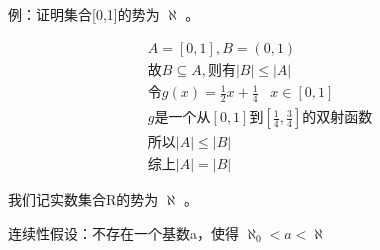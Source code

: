 \documentclass[12pt,a4paper,oneside]{ctexart}
\begin{document}
例：证明集合{[}0,1{]}的势为 \(\aleph\) 。

\[\begin{gathered}
A=[0,1],B=(0,1)\\
\text{故}B\subseteq A,\text{则有}|B|\leqslant|A|\\
\text{令}g(x)=\frac{1}{2}x+\frac{1}{4}\;\;\;x\in [0,1]\\
g\text{是一个从}[0,1]\text{到}[\frac{1}{4},\frac{3}{4}]\text{的双射函数}\\
\text{所以}|A|\leqslant|B|\\
\text{综上}|A|=|B|
\end{gathered}\]

我们记实数集合R的势为 \(\aleph\) 。

连续性假设：不存在一个基数a，使得 \(\aleph_0<a<\aleph\)
\end{document}
